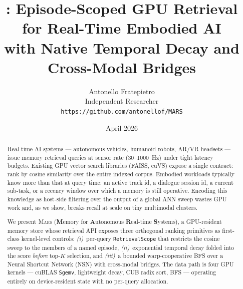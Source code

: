 \documentclass[11pt]{article}
\title{\vspace{-1.5cm}\mars{}: Episode-Scoped GPU Retrieval\\
for Real-Time Embodied AI\\
{\large with Native Temporal Decay and Cross-Modal Bridges}}
\author{Antonello Fratepietro\\
Independent Researcher\\
\texttt{https://github.com/antonellof/MARS}}
\date{April 2026}
\newcommand{\mars}{\textsc{Mars}}
\begin{document}
\maketitle

\begin{abstract}
Real-time AI systems --- autonomous vehicles, humanoid robots, AR/VR
headsets --- issue memory retrieval queries at sensor rate (30--1000~Hz)
under tight latency budgets. Existing GPU vector search libraries
(FAISS, cuVS) expose a single contract: rank by cosine similarity over
the entire indexed corpus. Embodied workloads typically know more than
that at query time: an active track id, a dialogue session id, a
current sub-task, or a recency window over which a memory is still
operative. Encoding this knowledge as host-side filtering over the
output of a global ANN sweep wastes GPU work and, as we show, breaks
recall at scale on tiny multimodal clusters.

We present \mars{} (\textbf{M}emory for \textbf{A}utonomous
\textbf{R}eal-time \textbf{S}ystems), a GPU-resident memory store
whose retrieval API exposes three orthogonal ranking primitives as
first-class kernel-level controls: \emph{(i)}~per-query
\texttt{RetrievalScope} that restricts the cosine sweep to the members
of a named episode, \emph{(ii)}~exponential temporal decay folded into
the score \emph{before} top-$K$ selection, and \emph{(iii)}~a bounded
warp-cooperative BFS over a Neural Shortcut Network (NSN) with
cross-modal bridges. The data path is four GPU kernels --- cuBLAS
\texttt{Sgemv}, lightweight decay, CUB radix sort, BFS --- operating
entirely on device-resident state with no per-query allocation.


\end{abstract}
\end{document}
